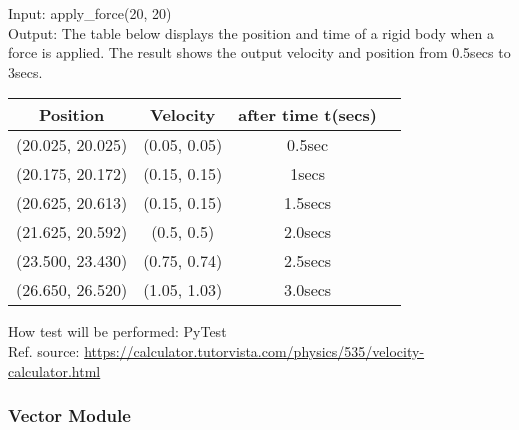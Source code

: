 \documentclass[12pt, titlepage]{article}
\begin{document}
\begin{enumerate}
Input: apply\_force(20, 20)\\
Output: The table below displays the position and time of a rigid body when a force is applied. The result shows the output velocity and position from 0.5secs to 3secs.
\begin{table} [h!]
	
	\centering
	
	\begin{tabular}{|c|c|c|c}
		
		\hline	
		
	\textbf{Position} &\textbf{Velocity} & \textbf{after time t(secs)}\\
	\hline 

	\hline(20.025, 20.025)& (0.05, 0.05)& 0.5sec \\ \hline
		
    (20.175, 20.172)& (0.15, 0.15)& 1secs \\ \hline
		
	(20.625, 20.613)& (0.15, 0.15)& 1.5secs \\ \hline
		
    (21.625, 20.592)& (0.5, 0.5)& 2.0secs \\ \hline
		
	(23.500, 23.430)& (0.75, 0.74)& 2.5secs \\ \hline
	
	(26.650, 26.520)& (1.05, 1.03)& 3.0secs \\ \hline
		
	\end{tabular}
	
	
\end{table}
How test will be performed: PyTest\\

Ref. source: \url{https://calculator.tutorvista.com/physics/535/velocity-calculator.html}
\end{enumerate}

\subsubsection{Vector Module}
\end{document}
